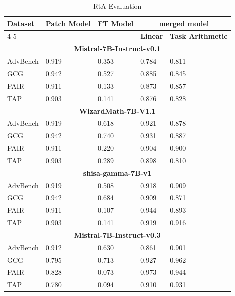 \documentclass[conference,compsoc]{IEEEtran}
\begin{document}
\begin{table}[h]
\centering
\caption{RtA Evaluation}
\label{tab:rta_combined}
\begin{tabular}{l|l|l|ll}
\hline\hline
\multirow{2}{*}{\textbf{Dataset}} & \multirow{2}{*}{\textbf{Patch Model}} & \multirow{2}{*}{\textbf{FT Model}} & \multicolumn{2}{c}{\textbf{merged model}} \\ 
\cline{4-5}
 &  &  & \multicolumn{1}{l|}{\textbf{Linear}} & \textbf{Task Arithmetic} \\ 
\hline
\multicolumn{5}{c}{\textbf{Mistral-7B-Instruct-v0.1}} \\ \hline
AdvBench                 & 0.919 & 0.353 & \multicolumn{1}{l|}{0.784}  & 0.811 \\
GCG                      & 0.942 & 0.527 & \multicolumn{1}{l|}{0.885}  & 0.845 \\
PAIR                     & 0.911 & 0.133 & \multicolumn{1}{l|}{0.873}  & 0.857 \\
TAP                      & 0.903 & 0.141 & \multicolumn{1}{l|}{0.876}  & 0.828 \\ 
\hline
\multicolumn{5}{c}{\textbf{WizardMath-7B-V1.1}} \\ \hline
AdvBench                 & 0.919 & 0.618 & \multicolumn{1}{l|}{0.921}  & 0.878 \\
GCG                      & 0.942 & 0.740 & \multicolumn{1}{l|}{0.931}  & 0.887 \\
PAIR                     & 0.911 & 0.220 & \multicolumn{1}{l|}{0.904}  & 0.900 \\
TAP                      & 0.903 & 0.289 & \multicolumn{1}{l|}{0.898}  & 0.810 \\ 
\hline
\multicolumn{5}{c}{\textbf{shisa-gamma-7B-v1}} \\ \hline
AdvBench                 & 0.919 & 0.508 & \multicolumn{1}{l|}{0.918}  & 0.909 \\
GCG                      & 0.942 & 0.684 & \multicolumn{1}{l|}{0.909}  & 0.871 \\
PAIR                     & 0.911 & 0.107 & \multicolumn{1}{l|}{0.944}  & 0.893 \\
TAP                      & 0.903 & 0.141 & \multicolumn{1}{l|}{0.919}  & 0.916 \\ 
\hline
\multicolumn{5}{c}{\textbf{Mistral-7B-Instruct-v0.3}} \\ \hline
AdvBench                 & 0.912 & 0.630 & \multicolumn{1}{l|}{0.861}  & 0.901 \\
GCG                      & 0.795 & 0.713 & \multicolumn{1}{l|}{0.927}  & 0.962 \\
PAIR                     & 0.828 & 0.073 & \multicolumn{1}{l|}{0.973}  & 0.944 \\
TAP                      & 0.780 & 0.094 & \multicolumn{1}{l|}{0.910}  & 0.931 \\ 
\hline\hline
\end{tabular}
\end{table}
\end{document}
